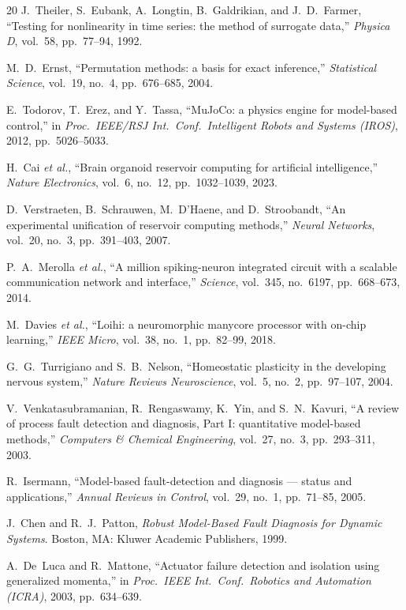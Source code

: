 \begin{thebibliography}{20}
J.~Theiler, S.~Eubank, A.~Longtin, B.~Galdrikian, and J.~D.~Farmer, ``Testing
for nonlinearity in time series: the method of surrogate data,'' \emph{Physica
D}, vol.~58, pp.~77--94, 1992.

M.~D.~Ernst, ``Permutation methods: a basis for exact inference,''
\emph{Statistical Science}, vol.~19, no.~4, pp.~676--685, 2004.

E.~Todorov, T.~Erez, and Y.~Tassa, ``MuJoCo: a physics engine for model-based
control,'' in \emph{Proc.\ IEEE/RSJ Int.\ Conf.\ Intelligent Robots and Systems
(IROS)}, 2012, pp.~5026--5033.

H.~Cai \emph{et al.}, ``Brain organoid reservoir computing for artificial
intelligence,'' \emph{Nature Electronics}, vol.~6, no.~12, pp.~1032--1039,
2023.

D.~Verstraeten, B.~Schrauwen, M.~D'Haene, and D.~Stroobandt, ``An experimental
unification of reservoir computing methods,'' \emph{Neural Networks}, vol.~20,
no.~3, pp.~391--403, 2007.

P.~A.~Merolla \emph{et al.}, ``A million spiking-neuron integrated circuit with
a scalable communication network and interface,'' \emph{Science}, vol.~345,
no.~6197, pp.~668--673, 2014.

M.~Davies \emph{et al.}, ``Loihi: a neuromorphic manycore processor with
on-chip learning,'' \emph{IEEE Micro}, vol.~38, no.~1, pp.~82--99, 2018.

G.~G.~Turrigiano and S.~B.~Nelson, ``Homeostatic plasticity in the developing
nervous system,'' \emph{Nature Reviews Neuroscience}, vol.~5, no.~2,
pp.~97--107, 2004.

V.~Venkatasubramanian, R.~Rengaswamy, K.~Yin, and S.~N.~Kavuri, ``A review of
process fault detection and diagnosis, Part I: quantitative model-based
methods,'' \emph{Computers \& Chemical Engineering}, vol.~27, no.~3,
pp.~293--311, 2003.

R.~Isermann, ``Model-based fault-detection and diagnosis --- status and
applications,'' \emph{Annual Reviews in Control}, vol.~29, no.~1, pp.~71--85,
2005.

J.~Chen and R.~J.~Patton, \emph{Robust Model-Based Fault Diagnosis for Dynamic
Systems}. Boston, MA: Kluwer Academic Publishers, 1999.

A.~De~Luca and R.~Mattone, ``Actuator failure detection and isolation using
generalized momenta,'' in \emph{Proc.\ IEEE Int.\ Conf.\ Robotics and
Automation (ICRA)}, 2003, pp.~634--639.


\end{thebibliography}
